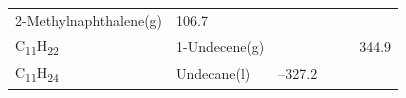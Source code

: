 \documentclass[
  9pt,
]{extbook}
\theoremstyle{definition}
\theoremstyle{definition}
\theoremstyle{definition}
\theoremstyle{remark}
\begin{document}
\begin{longtable}[]{@{}llllll@{}}
\begin{minipage}[t]{0.17\columnwidth}
2-Methylnaphthalene(g)\strut
\end{minipage} & \begin{minipage}[t]{0.15\columnwidth}\raggedright
106.7\strut
\end{minipage} & \begin{minipage}[t]{0.15\columnwidth}\raggedright
\strut
\end{minipage} & \begin{minipage}[t]{0.14\columnwidth}\raggedright
\strut
\end{minipage} & \begin{minipage}[t]{0.14\columnwidth}\raggedright
\strut
\end{minipage}\tabularnewline
\begin{minipage}[t]{0.07\columnwidth}\raggedright
C\textsubscript{11}H\textsubscript{22}\strut
\end{minipage} & \begin{minipage}[t]{0.17\columnwidth}\raggedright
1-Undecene(g)\strut
\end{minipage} & \begin{minipage}[t]{0.15\columnwidth}\raggedright
\strut
\end{minipage} & \begin{minipage}[t]{0.15\columnwidth}\raggedright
\strut
\end{minipage} & \begin{minipage}[t]{0.14\columnwidth}\raggedright
\strut
\end{minipage} & \begin{minipage}[t]{0.14\columnwidth}\raggedright
344.9\strut
\end{minipage}\tabularnewline
\begin{minipage}[t]{0.07\columnwidth}\raggedright
C\textsubscript{11}H\textsubscript{24}\strut
\end{minipage} & \begin{minipage}[t]{0.17\columnwidth}\raggedright
Undecane(l)\strut
\end{minipage} & \begin{minipage}[t]{0.15\columnwidth}\raggedright
--327.2\strut
\end{minipage} & \begin{minipage}[t]{0.15\columnwidth}\raggedright
\strut
\end{minipage} & \begin{minipage}[t]{0.14\columnwidth}\raggedright
\strut
\end{minipage} & \begin{minipage}[t]{0.14\columnwidth}\raggedright

\end{minipage}
\end{longtable}
\end{document}
